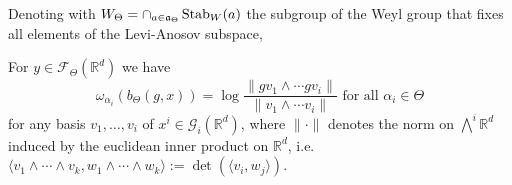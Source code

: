 \documentclass{report}
\begin{document}
Denoting with $W_\Theta = \cap_{a \in \mathfrak a_\Theta} \operatorname{Stab}_W(a)$ the subgroup of the Weyl group that fixes all elements of the Levi-Anosov subspace,  


\begin{lemma}\label{lem:busemann_weight}
For $y \in \mathcal F_\Theta(\mathbb R^d)$ we have    
\[
    \omega_{\alpha_i}(b_\Theta(g, x)) =
    \log \frac{\| g v_1 \wedge \cdots g v_i \|}{ \| v_1 \wedge \cdots v_i \| }
    \text{ for all } \alpha_i \in \Theta
\]
for any basis $v_1, \ldots, v_i$ of $x^i \in \mathcal G_i(\mathbb R^d)$, where $\| \cdot \|$ denotes the norm on $\bigwedge^i \mathbb R^d$ induced by the euclidean inner product on $\mathbb R^d$, 
i.e.\ $ \langle v_1 \wedge \cdots \wedge v_k, w_1 \wedge \cdots \wedge w_k \rangle := \det(\langle v_i, w_j \rangle)$.
\end{lemma}
\end{document}
